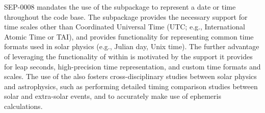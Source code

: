 SEP-0008 \citep{sep-0008} mandates the use of the  subpackage to represent a date or time throughout the \sunpypkg code base.
The  subpackage provides the necessary support for time scales other than Coordinated Universal Time (UTC; e.g., International Atomic Time or TAI), and provides functionality for representing common time formats used in solar physics (e.g., Julian day, Unix time).
The further advantage of leveraging the functionality of  within \sunpypkg is motivated by the support it provides for leap seconds, high-precision time representation, and custom time formats and scales.
The use of the  also fosters cross-disciplinary studies between solar physics and astrophysics, such as performing detailed timing comparison studies between solar and extra-solar events, and to accurately make use of ephemeris calculations.

